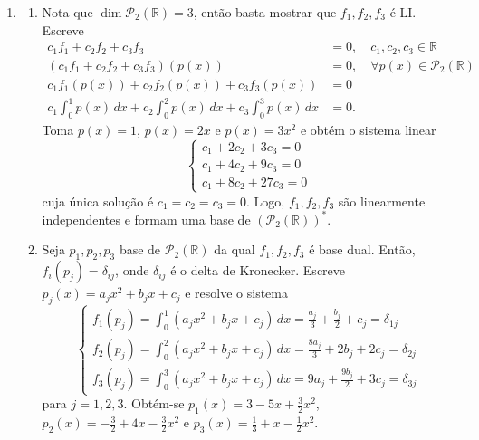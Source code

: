 \documentclass{article}
\begin{document}
\begin{enumerate}
    \item [\textbf{E4}]
        \begin{enumerate}
            \item [(a)] Nota que \(\dim \mathcal{P}_2(\mathbb{R}) = 3\), então basta mostrar que \(f_1, f_2, f_3\) é LI. Escreve
            \begin{align}
                c_1 f_1 + c_2 f_2 + c_3 f_3 &= 0, \quad c_1, c_2, c_3 \in \mathbb{R} \\
                (c_1 f_1 + c_2 f_2 + c_3 f_3)(p(x)) &= 0, \quad \forall p(x) \in \mathcal{P}_2(\mathbb{R}) \\
                c_1 f_1(p(x)) + c_2 f_2(p(x)) + c_3 f_3(p(x)) &= 0 \\
                c_1 \int_{0}^{1} p(x) \, dx + c_2 \int_{0}^{2} p(x) \, dx + c_3 \int_{0}^{3} p(x) \, dx &= 0.
            \end{align}
            Toma \(p(x) = 1\), \(p(x) = 2x\) e \(p(x) = 3x^2\) e obtém o sistema linear
            \[\begin{cases}
                c_1 + 2 c_2 + 3 c_3 = 0 \\
                c_1 + 4 c_2 + 9 c_3 = 0 \\
                c_1 + 8 c_2 + 27 c_3 = 0
            \end{cases}\]
            cuja única solução é \(c_1 = c_2 = c_3 = 0\). Logo, \(f_1, f_2, f_3\) são linearmente independentes e formam uma base de \((\mathcal{P}_2(\mathbb{R}))^*\).
            \item [(b)] Seja \(p_1, p_2, p_3\) base de \(\mathcal{P}_2(\mathbb{R})\) da qual \(f_1, f_2, f_3\) é base dual. Então, \(f_i(p_j) = \delta_{ij}\), onde \(\delta_{ij}\) é o delta de Kronecker. Escreve \(p_j(x) = a_j x^2 + b_j x + c_j\) e resolve o sistema
            \[\begin{cases}
                f_1(p_j) = \int_{0}^{1} (a_j x^2 + b_j x + c_j) \, dx = \frac{a_j}{3} + \frac{b_j}{2} + c_j = \delta_{1j} \\
                f_2(p_j) = \int_{0}^{2} (a_j x^2 + b_j x + c_j) \, dx = \frac{8 a_j}{3} + 2 b_j + 2 c_j = \delta_{2j} \\
                f_3(p_j) = \int_{0}^{3} (a_j x^2 + b_j x + c_j) \, dx = 9 a_j + \frac{9 b_j}{2} + 3 c_j = \delta_{3j}
            \end{cases}\]
            para \(j = 1, 2, 3\). Obtém-se \(p_1(x) = 3-5x+\frac{3}{2}x^2\), \(p_2(x) = -\frac{3}{2} + 4x - \frac{3}{2}x^2\) e \(p_3(x) = \frac{1}{3}+x - \frac{1}{2}x^2\).
        \end{enumerate}

\end{enumerate}
\end{document}
